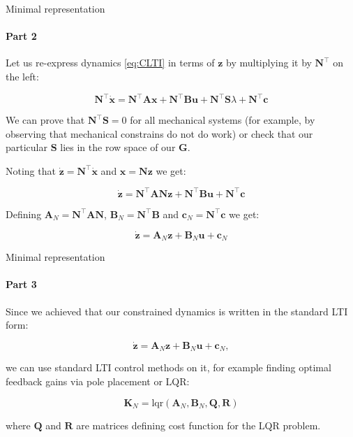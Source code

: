 \documentclass{beamer}
\begin{document}
\begin{frame}{Minimal representation}
\framesubtitle{Part 2}
\begin{flushleft}

Let us re-express dynamics \eqref{eq:CLTI} in terms of $\mathbf{z}$ by multiplying it by $\mathbf{N}^\top$ on the left:

\begin{equation}
    \mathbf{N}^\top \dot{\mathbf{x}} = \mathbf{N}^\top \mathbf{A} \mathbf{x} + \mathbf{N}^\top \mathbf{B} \mathbf{u} + \mathbf{N}^\top \mathbf{S} \lambda + \mathbf{N}^\top \mathbf{c}
\end{equation}

We can prove that $\mathbf{N}^\top \mathbf{S} = 0$ for all mechanical systems (for example, by observing that mechanical constrains do not do work) or check that our particular $\mathbf{S}$ lies in the row space of our $\mathbf{G}$.

Noting that $\dot{\mathbf{z}} = \mathbf{N}^\top \dot{\mathbf{x}}$ and $\mathbf{x} = \mathbf{N}\mathbf{z}$ we get:

\begin{equation}
    \dot{\mathbf{z}} = \mathbf{N}^\top \mathbf{A} \mathbf{N} \mathbf{z} + \mathbf{N}^\top \mathbf{B} \mathbf{u} + \mathbf{N}^\top \mathbf{c}
\end{equation}

Defining $\mathbf{A}_N = \mathbf{N}^\top \mathbf{A} \mathbf{N}$, $\mathbf{B}_N = \mathbf{N}^\top \mathbf{B}$ and $\mathbf{c}_N = \mathbf{N}^\top \mathbf{c}$ we get:

\begin{equation}
    \dot{\mathbf{z}} = \mathbf{A}_N \mathbf{z} + \mathbf{B}_N \mathbf{u} + \mathbf{c}_N
\end{equation}

\end{flushleft}
\end{frame}




\begin{frame}{Minimal representation}
\framesubtitle{Part 3}
\begin{flushleft}

Since we achieved that our constrained dynamics is written in the standard LTI form:

\begin{equation}
    \dot{\mathbf{z}} = \mathbf{A}_N \mathbf{z} + \mathbf{B}_N \mathbf{u} + \mathbf{c}_N,
\end{equation}

we can use standard LTI control methods on it, for example finding optimal feedback gains via pole placement or LQR:

\begin{equation}
    \mathbf{K}_N = \text{lqr}(\mathbf{A}_N, \mathbf{B}_N, \mathbf{Q}, \mathbf{R})
\end{equation}

where $\mathbf{Q}$ and $\mathbf{R}$ are matrices defining cost function for the LQR problem.

\end{flushleft}
\end{frame}
\end{document}
